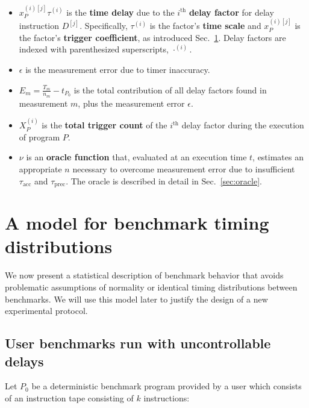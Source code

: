 \documentclass[conference]{IEEEtran}
\begin{document}
\begin{itemize}
    \item
    $x_P^{(i)[j]} \tau^{(i)}$ is the \textbf{time delay} due to the
    $i^{\textrm{th}}$ \textbf{delay factor} for delay instruction $D^{[j]}$.  Specifically,
    $\tau^{(i)}$ is the factor's \textbf{time scale} and $x_P^{(i)[j]}$ is the factor's
    \textbf{trigger coefficient}, as introduced Sec.~\ref{sec:model}. Delay factors are indexed with  parenthesized
    superscripts, $\cdot^{(i)}$.

    \item
    $\epsilon$ is the measurement error due to timer inaccuracy.

    \item
    $E_m = \frac{T_m}{n_m} - t_{P_0}$ is the total contribution of all delay
factors found in measurement $m$, plus the measurement error $\epsilon$.

    \item
    $X^{(i)}_P$ is the \textbf{total trigger count} of the $i^{\textrm{th}}$
    delay factor during the execution of program $P$.

    \item
    $\nu$ is an \textbf{oracle function} that, evaluated at an execution time
$t$, estimates an appropriate $n$ necessary to overcome measurement error due
to insufficient
    $\tau_{\textrm{acc}}$ and $\tau_{\textrm{prec}}$. The oracle is described in detail in Sec.~\ref{sec:oracle}.
\end{itemize}

\section{A model for benchmark timing distributions}
\label{sec:model}

We now present a statistical description of benchmark behavior that avoids
problematic assumptions of normality or identical timing distributions between
benchmarks. We will use this model later to justify the design of a new
experimental protocol.

\subsection{User benchmarks run with uncontrollable delays}
\label{sec:programmodel}

Let $P_0$ be a deterministic benchmark program provided by a user which
consists of an instruction tape consisting of $k$ instructions:
\end{document}
